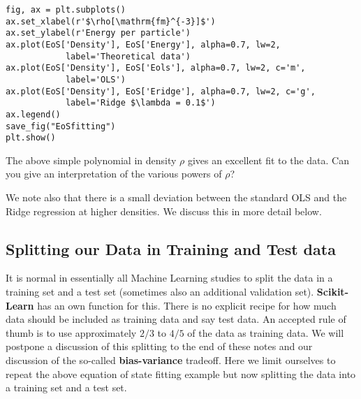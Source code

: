 \documentclass[%
oneside,                 %
final,                   %
10pt]{article}
\begin{document}
\begin{verbatim}
fig, ax = plt.subplots()
ax.set_xlabel(r'$\rho[\mathrm{fm}^{-3}]$')
ax.set_ylabel(r'Energy per particle')
ax.plot(EoS['Density'], EoS['Energy'], alpha=0.7, lw=2,
            label='Theoretical data')
ax.plot(EoS['Density'], EoS['Eols'], alpha=0.7, lw=2, c='m',
            label='OLS')
ax.plot(EoS['Density'], EoS['Eridge'], alpha=0.7, lw=2, c='g',
            label='Ridge $\lambda = 0.1$')
ax.legend()
save_fig("EoSfitting")
plt.show()
\end{verbatim}

The above simple polynomial in density $\rho$ gives an excellent fit
to the data. Can you give an interpretation of the various powers of $\rho$?

We note also that there is a small deviation between the
standard OLS and the Ridge regression at higher densities. We discuss this in more detail
below.


\subsection*{Splitting our Data in Training and Test data}

It is normal in essentially all Machine Learning studies to split the
data in a training set and a test set (sometimes also an additional
validation set).  \textbf{Scikit-Learn} has an own function for this. There
is no explicit recipe for how much data should be included as training
data and say test data.  An accepted rule of thumb is to use
approximately $2/3$ to $4/5$ of the data as training data. We will
postpone a discussion of this splitting to the end of these notes and
our discussion of the so-called \textbf{bias-variance} tradeoff. Here we
limit ourselves to repeat the above equation of state fitting example
but now splitting the data into a training set and a test set.
\end{document}
